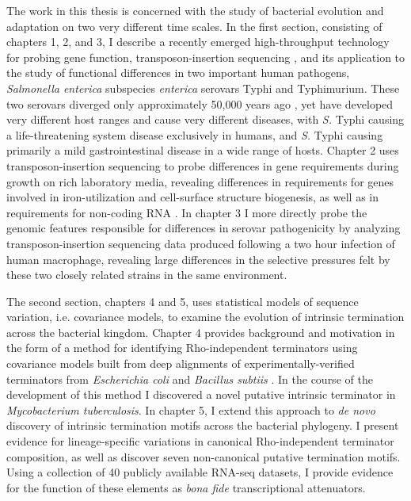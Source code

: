 The work in this thesis is concerned with the study of bacterial evolution and adaptation on two very different time scales. In the first section, consisting of chapters 1, 2, and 3, I describe a recently emerged high-throughput technology for probing gene function, transposon-insertion sequencing \parencite{Barquist2013}, and its application to the study of functional differences in two important human pathogens, \textit{Salmonella enterica} subspecies \textit{enterica} serovars Typhi and Typhimurium. These two serovars diverged only approximately 50,000 years ago \parencite{Kidgell2002}, yet have developed very different host ranges and cause very different diseases, with \textit{S.} Typhi causing a life-threatening system disease exclusively in humans, and \textit{S.} Typhi causing primarily a mild gastrointestinal disease in a wide range of hosts. Chapter 2 uses transposon-insertion sequencing to probe differences in gene requirements during growth on rich laboratory media, revealing differences in requirements for genes involved in iron-utilization and cell-surface structure biogenesis, as well as in requirements for non-coding RNA \parencite{Barquist2013a}. In chapter 3 I more directly probe the genomic features responsible for differences in serovar pathogenicity by analyzing transposon-insertion sequencing data produced following a two hour infection of human macrophage, revealing large differences in the selective pressures felt by these two closely related strains in the same environment.

The second section, chapters 4 and 5, uses statistical models of sequence variation, i.e. covariance models, to examine the evolution of intrinsic termination across the bacterial kingdom. Chapter 4 provides background and motivation in the form of a method for identifying Rho-independent terminators using covariance models built from deep alignments of experimentally-verified terminators from \textit{Escherichia coli} and \textit{Bacillus subtiis} \parencite{Gardner2011a}. In the course of the development of this method I discovered a novel putative intrinsic terminator in \textit{Mycobacterium tuberculosis}. In chapter 5, I extend this approach to \textit{de novo} discovery of intrinsic termination motifs across the bacterial phylogeny. I present evidence for lineage-specific variations in canonical Rho-independent terminator composition, as well as discover seven non-canonical putative termination motifs. Using a collection of 40 publicly available RNA-seq datasets, I provide evidence for the function of these elements as \textit{bona fide} transcriptional attenuators.